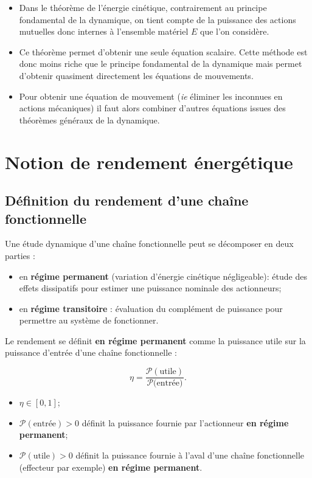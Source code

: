\begin{remarque}%
\begin{itemize}
\item Dans le théorème de l'énergie cinétique, contrairement au principe fondamental de la dynamique, on tient compte de la puissance des actions mutuelles donc internes à l'ensemble matériel $E$ que l'on considère.
\item Ce théorème permet d'obtenir une seule équation scalaire. Cette méthode est donc moins riche que le principe fondamental de la dynamique mais permet d'obtenir quasiment directement les équations de mouvements.
\item Pour obtenir une équation de mouvement (\textit{ie} éliminer les inconnues en actions mécaniques) il faut alors combiner d'autres équations issues des théorèmes généraux de la dynamique.
\end{itemize}
\end{remarque}%


\section{Notion de rendement énergétique}
\subsection{Définition du rendement d'une chaîne fonctionnelle}

Une étude dynamique d'une chaîne fonctionnelle peut se décomposer en deux parties :
\begin{itemize}
\item en \textbf{régime permanent} (variation d'énergie cinétique négligeable): étude des effets dissipatifs pour estimer une puissance nominale des actionneurs;
\item en \textbf{régime transitoire} : évaluation du complément de puissance pour permettre au système de fonctionner.
\end{itemize} 

\begin{defi}
Le rendement se définit \textbf{en régime permanent} comme la puissance utile sur la puissance d'entrée d'une chaîne fonctionnelle : 

$$
\eta=\dfrac{\mathcal{P}(\text{utile})}{\mathcal{P}(\text{entrée)}}.
$$

\begin{itemize}
\item $\eta\in\left[0,1\right]$;
\item $\mathcal{P}(\text{entrée})>0$ définit la puissance fournie par l'actionneur \textbf{en régime permanent};
\item $\mathcal{P}(\text{utile})>0$ définit la puissance fournie à l'aval d'une chaîne fonctionnelle (effecteur par exemple) \textbf{en régime permanent}.
\end{itemize}
\end{defi}

